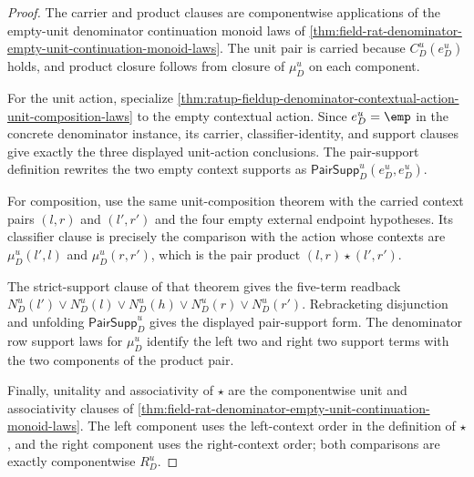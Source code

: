 \begin{proof}
The carrier and product clauses are componentwise applications of the empty-unit
denominator continuation monoid laws of
\autoref{thm:field-rat-denominator-empty-unit-continuation-monoid-laws}. The
unit pair is carried because $C_D^u(e_D^u)$ holds, and product closure follows
from closure of $\mu_D^u$ on each component.

For the unit action, specialize
\autoref{thm:ratup-fieldup-denominator-contextual-action-unit-composition-laws}
to the empty contextual action. Since $e_D^u=\emp$ in the concrete denominator
instance, its carrier, classifier-identity, and support clauses give exactly the
three displayed unit-action conclusions. The pair-support definition rewrites
the two empty context supports as $\mathsf{PairSupp}_D^u(e_D^u,e_D^u)$.

For composition, use the same unit-composition theorem with the carried context
pairs $(l,r)$ and $(l',r')$ and the four empty external endpoint hypotheses. Its
classifier clause is precisely the comparison with the action whose contexts are
$\mu_D^u(l',l)$ and $\mu_D^u(r,r')$, which is the pair product
$(l,r)\star(l',r')$.

The strict-support clause of that theorem gives the five-term readback
$N_D^u(l')\lor N_D^u(l)\lor N_D^u(h)\lor N_D^u(r)\lor N_D^u(r')$. Rebracketing
disjunction and unfolding $\mathsf{PairSupp}_D^u$ gives the displayed
pair-support form. The denominator row support laws for $\mu_D^u$ identify the
left two and right two support terms with the two components of the product pair.

Finally, unitality and associativity of $\star$ are the componentwise unit and
associativity clauses of
\autoref{thm:field-rat-denominator-empty-unit-continuation-monoid-laws}. The
left component uses the left-context order in the definition of $\star$, and the
right component uses the right-context order; both comparisons are exactly
componentwise $R_D^u$.
\end{proof}

